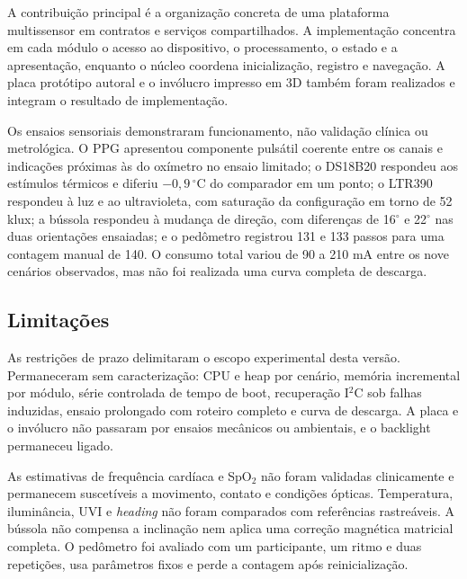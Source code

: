 \documentclass[a4paper,12pt]{article}
\begin{document}
A contribui\c{c}\~ao principal \'e a organiza\c{c}\~ao concreta de uma plataforma multissensor em contratos e servi\c{c}os compartilhados. A implementa\c{c}\~ao concentra em cada m\'odulo o acesso ao dispositivo, o processamento, o estado e a apresenta\c{c}\~ao, enquanto o n\'ucleo coordena inicializa\c{c}\~ao, registro e navega\c{c}\~ao. A placa prot\'otipo autoral e o inv\'olucro impresso em 3D tamb\'em foram realizados e integram o resultado de implementa\c{c}\~ao.


Os ensaios sensoriais demonstraram funcionamento, n\~ao valida\c{c}\~ao cl\'inica ou metrol\'ogica. O PPG apresentou componente puls\'atil coerente entre os canais e indica\c{c}\~oes pr\'oximas \`as do ox\'imetro no ensaio limitado; o DS18B20 respondeu aos est\'imulos t\'ermicos e diferiu $-0{,}9\,^\circ$C do comparador em um ponto; o LTR390 respondeu \`a luz e ao ultravioleta, com satura\c{c}\~ao da configura\c{c}\~ao em torno de 52 klux; a b\'ussola respondeu \`a mudan\c{c}a de dire\c{c}\~ao, com diferen\c{c}as de 16$^\circ$ e 22$^\circ$ nas duas orienta\c{c}\~oes ensaiadas; e o ped\^ometro registrou 131 e 133 passos para uma contagem manual de 140. O consumo total variou de 90 a 210 mA entre os nove cen\'arios observados, mas n\~ao foi realizada uma curva completa de descarga.


\subsection{Limita\c{c}\~oes}


As restri\c{c}\~oes de prazo delimitaram o escopo experimental desta vers\~ao. Permaneceram sem caracteriza\c{c}\~ao: CPU e heap por cen\'ario, mem\'oria incremental por m\'odulo, s\'erie controlada de tempo de boot, recupera\c{c}\~ao I$^2$C sob falhas induzidas, ensaio prolongado com roteiro completo e curva de descarga. A placa e o inv\'olucro n\~ao passaram por ensaios mec\^anicos ou ambientais, e o backlight permaneceu ligado.


As estimativas de frequ\^encia card\'iaca e SpO$_2$ n\~ao foram validadas clinicamente e permanecem suscet\'iveis a movimento, contato e condi\c{c}\~oes \'opticas. Temperatura, ilumin\^ancia, UVI e \emph{heading} n\~ao foram comparados com refer\^encias rastre\'aveis. A b\'ussola n\~ao compensa a inclina\c{c}\~ao nem aplica uma corre\c{c}\~ao magn\'etica matricial completa. O ped\^ometro foi avaliado com um participante, um ritmo e duas repeti\c{c}\~oes, usa par\^ametros fixos e perde a contagem ap\'os reinicializa\c{c}\~ao.
\end{document}
